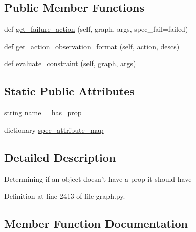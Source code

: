 \subsection*{Public Member Functions}
\begin{DoxyCompactItemize}
\item 
def \hyperlink{classlight__chats_1_1graph_1_1HasPropConstraint_aff9fe175fee6b71e845e03433593814c}{get\+\_\+failure\+\_\+action} (self, graph, args, spec\+\_\+fail=\textquotesingle{}failed\textquotesingle{})
\item 
def \hyperlink{classlight__chats_1_1graph_1_1HasPropConstraint_a306f2581a6d32cec3edd07fda539429a}{get\+\_\+action\+\_\+observation\+\_\+format} (self, action, descs)
\item 
def \hyperlink{classlight__chats_1_1graph_1_1HasPropConstraint_a02fd1d0ec2da38cecbe274d0de49e993}{evaluate\+\_\+constraint} (self, graph, args)
\end{DoxyCompactItemize}
\subsection*{Static Public Attributes}
\begin{DoxyCompactItemize}
\item 
string \hyperlink{classlight__chats_1_1graph_1_1HasPropConstraint_a99d9e6127bf2ce7766f80d71e1a50818}{name} = \textquotesingle{}has\+\_\+prop\textquotesingle{}
\item 
dictionary \hyperlink{classlight__chats_1_1graph_1_1HasPropConstraint_a049145fe41d33a2103d0f319b1b8248e}{spec\+\_\+attribute\+\_\+map}
\end{DoxyCompactItemize}


\subsection{Detailed Description}
\begin{DoxyVerb}Determining if an object doesn't have a prop it should have\end{DoxyVerb}
 

Definition at line 2413 of file graph.\+py.



\subsection{Member Function Documentation}
\mbox{\label{classlight__chats_1_1graph_1_1HasPropConstraint_a02fd1d0ec2da38cecbe274d0de49e993}} 

